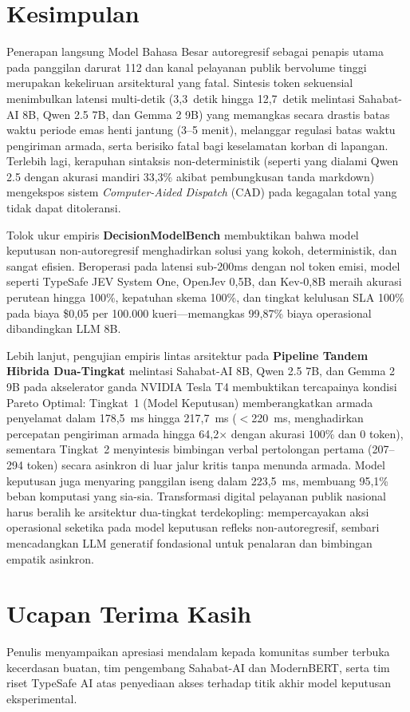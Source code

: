 \documentclass[journal,compsoc]{IEEEtran}
\begin{document}
\section{Kesimpulan}
Penerapan langsung Model Bahasa Besar autoregresif sebagai penapis utama pada panggilan darurat 112 dan kanal pelayanan publik bervolume tinggi merupakan kekeliruan arsitektural yang fatal. Sintesis token sekuensial menimbulkan latensi multi-detik (3,3~detik hingga 12,7~detik melintasi Sahabat-AI 8B, Qwen 2.5 7B, dan Gemma 2 9B) yang memangkas secara drastis batas waktu periode emas henti jantung (3--5 menit), melanggar regulasi batas waktu pengiriman armada, serta berisiko fatal bagi keselamatan korban di lapangan. Terlebih lagi, kerapuhan sintaksis non-deterministik (seperti yang dialami Qwen 2.5 dengan akurasi mandiri 33,3\% akibat pembungkusan tanda markdown) mengekspos sistem \textit{Computer-Aided Dispatch} (CAD) pada kegagalan total yang tidak dapat ditoleransi.

Tolok ukur empiris \textbf{DecisionModelBench} membuktikan bahwa model keputusan non-autoregresif menghadirkan solusi yang kokoh, deterministik, dan sangat efisien. Beroperasi pada latensi sub-200ms dengan nol token emisi, model seperti TypeSafe JEV System One, OpenJev 0,5B, dan Kev-0,8B meraih akurasi perutean hingga 100\%, kepatuhan skema 100\%, dan tingkat kelulusan SLA 100\% pada biaya \$0,05 per 100.000 kueri—memangkas 99,87\% biaya operasional dibandingkan LLM 8B.

Lebih lanjut, pengujian empiris lintas arsitektur pada \textbf{Pipeline Tandem Hibrida Dua-Tingkat} melintasi Sahabat-AI 8B, Qwen 2.5 7B, dan Gemma 2 9B pada akselerator ganda NVIDIA Tesla T4 membuktikan tercapainya kondisi Pareto Optimal: Tingkat~1 (Model Keputusan) memberangkatkan armada penyelamat dalam 178,5~ms hingga 217,7~ms ($<$220~ms, menghadirkan percepatan pengiriman armada hingga 64,2$\times$ dengan akurasi 100\% dan 0 token), sementara Tingkat~2 menyintesis bimbingan verbal pertolongan pertama (207--294 token) secara asinkron di luar jalur kritis tanpa menunda armada. Model keputusan juga menyaring panggilan iseng dalam 223,5~ms, membuang 95,1\% beban komputasi yang sia-sia. Transformasi digital pelayanan publik nasional harus beralih ke arsitektur dua-tingkat terdekopling: mempercayakan aksi operasional seketika pada model keputusan refleks non-autoregresif, sembari mencadangkan LLM generatif fondasional untuk penalaran dan bimbingan empatik asinkron.

\section*{Ucapan Terima Kasih}
Penulis menyampaikan apresiasi mendalam kepada komunitas sumber terbuka kecerdasan buatan, tim pengembang Sahabat-AI dan ModernBERT, serta tim riset TypeSafe AI atas penyediaan akses terhadap titik akhir model keputusan eksperimental.
\end{document}
